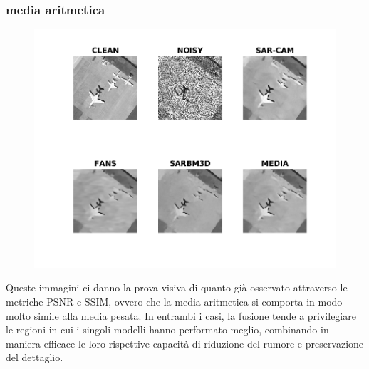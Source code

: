 \subsubsection{media aritmetica}
\begin{figure}[H]
    \centering
    \includegraphics[width=1.1\textwidth]{utils/MNairplane00.png}
    \caption{}
    \label{fig:airplane00MN}
  \end{figure}
  Queste immagini ci danno la prova visiva di quanto già osservato attraverso le metriche PSNR e SSIM, ovvero che 
  la media aritmetica si comporta in modo molto simile alla media pesata. In entrambi i casi, la fusione tende a 
  privilegiare le regioni in cui i singoli modelli hanno performato meglio, combinando in maniera efficace le 
  loro rispettive capacità di riduzione del rumore e preservazione del dettaglio.